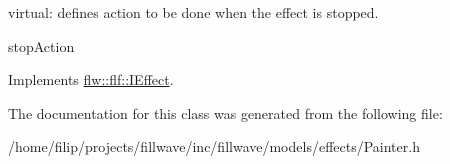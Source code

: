 virtual\+: defines action to be done when the effect is stopped. 

stop\+Action 

Implements \hyperlink{classflw_1_1flf_1_1IEffect_a1a03eaf63a9d4edbd8764540d2d4133c}{flw\+::flf\+::\+I\+Effect}.



The documentation for this class was generated from the following file\+:\begin{DoxyCompactItemize}
\item 
/home/filip/projects/fillwave/inc/fillwave/models/effects/Painter.\+h\end{DoxyCompactItemize}
